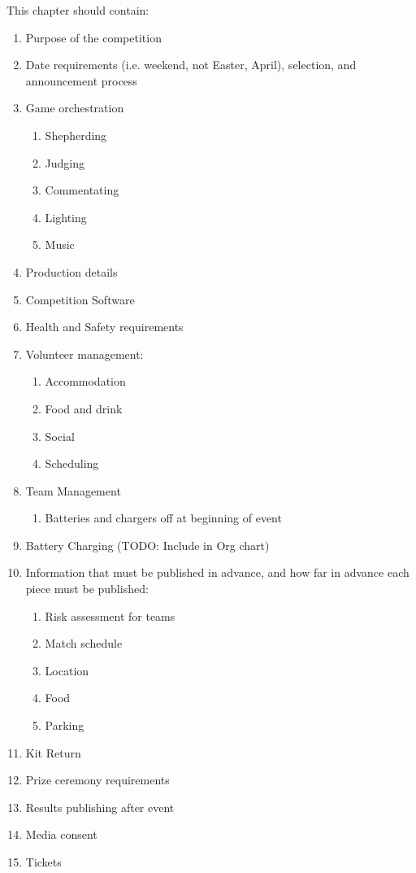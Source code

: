 This chapter should contain:
\begin{enumerate}
\item Purpose of the competition
\item Date requirements (i.e. weekend, not Easter, April), selection, and announcement process

\item Game orchestration
  \begin{enumerate}
  \item Shepherding
  \item Judging
  \item Commentating
  \item Lighting
  \item Music
  \end{enumerate}

\item Production details
\item Competition Software
\item Health and Safety requirements
\item Volunteer management:
  \begin{enumerate}
  \item Accommodation
  \item Food and drink
  \item Social
  \item Scheduling
  \end{enumerate}

\item Team Management
  \begin{enumerate}
  \item Batteries and chargers off at beginning of event
  \end{enumerate}

\item Battery Charging (TODO: Include in Org chart)

\item Information that must be published in advance, and how far in advance each piece must be published:
  \begin{enumerate}
  \item Risk assessment for teams
  \item Match schedule
  \item Location
  \item Food
  \item Parking
  \end{enumerate}

\item Kit Return
\item Prize ceremony requirements
\item Results publishing after event
\item Media consent
\item Tickets
\end{enumerate}
